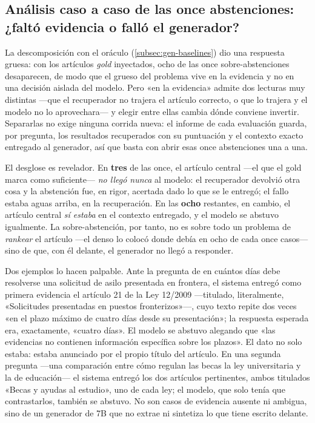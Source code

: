 \subsection{Análisis caso a caso de las once abstenciones: ¿faltó evidencia o falló el generador?}
\label{subsec:analisis-abstenciones}

La descomposición con el oráculo (\ref{subsec:gen-baselines}) dio una respuesta gruesa: con los artículos \emph{gold} inyectados, ocho de las once sobre-abstenciones desaparecen, de modo que el grueso del problema vive en la evidencia y no en una decisión aislada del modelo. Pero «en la evidencia» admite dos lecturas muy distintas —que el recuperador no trajera el artículo correcto, o que lo trajera y el modelo no lo aprovechara— y elegir entre ellas cambia dónde conviene invertir. Separarlas no exige ninguna corrida nueva: el informe de cada evaluación guarda, por pregunta, los resultados recuperados con su puntuación y el contexto exacto entregado al generador, así que basta con abrir esas once abstenciones una a una.

El desglose es revelador. En \textbf{tres} de las once, el artículo central —el que el gold marca como suficiente— \emph{no llegó nunca} al modelo: el recuperador devolvió otra cosa y la abstención fue, en rigor, acertada dado lo que se le entregó; el fallo estaba aguas arriba, en la recuperación. En las \textbf{ocho} restantes, en cambio, el artículo central \emph{sí estaba} en el contexto entregado, y el modelo se abstuvo igualmente. La sobre-abstención, por tanto, no es sobre todo un problema de \emph{rankear} el artículo —el denso lo colocó donde debía en ocho de cada once casos— sino de que, con él delante, el generador no llegó a responder.

Dos ejemplos lo hacen palpable. Ante la pregunta de en cuántos días debe resolverse una solicitud de asilo presentada en frontera, el sistema entregó como primera evidencia el artículo 21 de la Ley 12/2009 —titulado, literalmente, «Solicitudes presentadas en puestos fronterizos»—, cuyo texto repite dos veces «en el plazo máximo de cuatro días desde su presentación»; la respuesta esperada era, exactamente, «cuatro días». El modelo se abstuvo alegando que «las evidencias no contienen información específica sobre los plazos». El dato no solo estaba: estaba anunciado por el propio título del artículo. En una segunda pregunta —una comparación entre cómo regulan las becas la ley universitaria y la de educación— el sistema entregó los dos artículos pertinentes, ambos titulados «Becas y ayudas al estudio», uno de cada ley; el modelo, que solo tenía que contrastarlos, también se abstuvo. No son casos de evidencia ausente ni ambigua, sino de un generador de 7B que no extrae ni sintetiza lo que tiene escrito delante.

